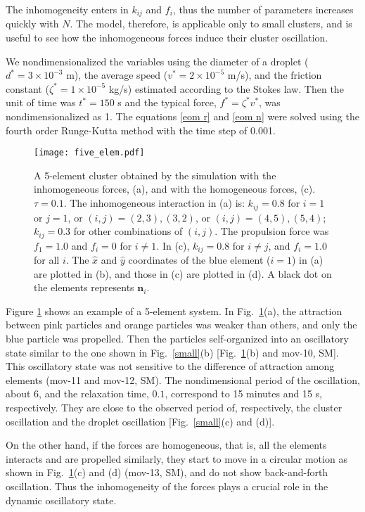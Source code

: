 \documentclass[showpacs]{revtex4-1}
\begin{document}
The inhomogeneity enters in $k_{ij}$ and $f_i$,
thus the number of parameters increases
quickly with $N$. The model, therefore, is applicable only to small
clusters, and is useful to see how the inhomogeneous forces induce their
cluster oscillation.

We nondimensionalized the variables using the diameter of a droplet
($d^\ast=3\times 10^{-3}$ m), the average speed ($v^\ast=2\times
10^{-5}$ m/s), and the friction constant ($\zeta^\ast=1\times 10^{-5}$
kg/s) estimated according to the Stokes law. Then the unit of time was
$t^\ast=150$ s and the typical force, $f^\ast=\zeta^\ast v^\ast$, was
nondimensionalized as 1. The equations \eqref{eom r} and
\eqref{eom n} were solved using the fourth order Runge-Kutta method with
the time step of 0.001.

 \begin{figure}[htbp]
  \begin{center}
 \texttt{[image: five\_elem.pdf]}
 \caption{A 5-element cluster obtained by the simulation with the
 inhomogeneous forces, (a), and with the homogeneous forces,
 (c). $\tau=0.1$. The inhomogeneous interaction in (a) is: $k_{ij}=0.8$
 for $i=1$ or $j=1$, or $(i,j)=(2,3),(3,2)$, or $(i,j)=(4,5),(5,4)$;
 $k_{ij}=0.3$ for other combinations of $(i,j)$. The propulsion force
 was $f_1=1.0$ and $f_i=0$ for $i\neq 1$. In (c), $k_{ij}=0.8$ for
 $i\neq j$, and $f_i=1.0$ for all $i$. The $\hat{x}$ and $\hat{y}$
 coordinates of the blue element ($i=1$) in (a) are plotted in (b), and
 those in (c) are plotted in (d). A
 black dot on the elements represents $\bm{n}_i$. } \label{simulation}   
  \end{center}
 \end{figure}

Figure \ref{simulation} shows an example of a 5-element system. In
Fig.~\ref{simulation}(a), the attraction between pink particles and
orange particles was weaker than others, and only the blue particle was
propelled. Then the particles self-organized into an oscillatory state
similar to the one shown in Fig.~\ref{small}(b)
[Fig.~\ref{simulation}(b) and mov-10,
SM]. This oscillatory state was not sensitive
to the difference of attraction among elements (mov-11 and mov-12, SM).
The nondimensional period of the oscillation, about $6$, and the
relaxation time, $0.1$, correspond to 15 minutes and 15 s,
respectively. They are close to the observed period of, respectively,
the cluster oscillation and the droplet oscillation [Fig.~\ref{small}(c)
and (d)].

On the other hand, if the forces are
homogeneous, that is, all the elements interacts and are propelled
similarly, they start to move in a circular motion as shown in
Fig.~\ref{simulation}(c) and (d) (mov-13, SM), and do not
show back-and-forth oscillation. Thus the inhomogeneity of the forces
plays a crucial role in the dynamic oscillatory state.
\end{document}
